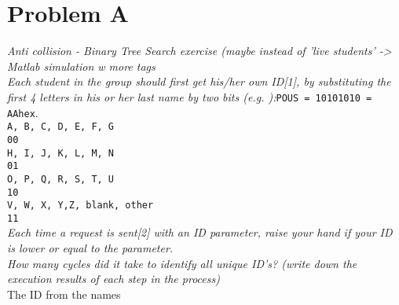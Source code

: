 \section{Problem A}
\textit{Anti collision - Binary Tree Search exercise (maybe instead of 'live students' -> Matlab simulation w more tags}\\

\textit{Each student in the group should first get his/her own ID[1], by substituting the first 4 letters in his or her last name by two bits (e.g. ):}\texttt{POUS = 10101010 = AAhex}.\\

\texttt{A, B, C, D, E, F, G} \\

\texttt{00} \\

\texttt{H, I, J, K, L, M, N }\\

\texttt{01 }\\

\texttt{O, P, Q, R, S, T, U} \\

\texttt{10} \\

\texttt{V, W, X, Y,Z, blank, other} \\

\texttt{11 }\\

\textit{Each time a request is sent[2] with an ID parameter, raise your hand if your ID is lower or equal to the parameter.}\\

\textit{How many cycles did it take to identify all unique ID's? (write down the execution results of each step in the process)}\\

The ID from the names 

